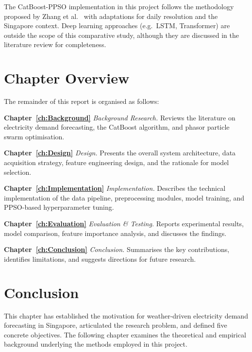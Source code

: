 The CatBoost-PPSO implementation in this project follows the methodology proposed by Zhang et al.\ \parencite{zhang2023catboostppso} with adaptations for daily resolution and the Singapore context. Deep learning approaches (e.g.\ LSTM, Transformer) are outside the scope of this comparative study, although they are discussed in the literature review for completeness.


\section{Chapter Overview}

The remainder of this report is organised as follows:

\textbf{Chapter~\ref{ch:Background}} \emph{Background Research.} Reviews the literature on electricity demand forecasting, the CatBoost algorithm, and phasor particle swarm optimisation.

\textbf{Chapter~\ref{ch:Design}} \emph{Design.} Presents the overall system architecture, data acquisition strategy, feature engineering design, and the rationale for model selection.

\textbf{Chapter~\ref{ch:Implementation}} \emph{Implementation.} Describes the technical implementation of the data pipeline, preprocessing modules, model training, and PPSO-based hyperparameter tuning.

\textbf{Chapter~\ref{ch:Evaluation}} \emph{Evaluation \& Testing.} Reports experimental results, model comparison, feature importance analysis, and discusses the findings.

\textbf{Chapter~\ref{ch:Conclusion}} \emph{Conclusion.} Summarises the key contributions, identifies limitations, and suggests directions for future research.


\section{Conclusion}

This chapter has established the motivation for weather-driven electricity demand forecasting in Singapore, articulated the research problem, and defined five concrete objectives. The following chapter examines the theoretical and empirical background underlying the methods employed in this project.